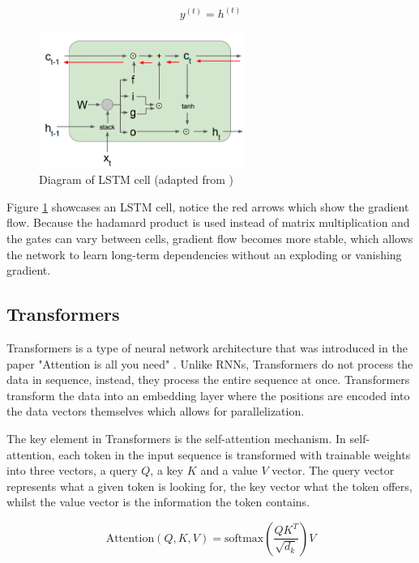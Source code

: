 \documentclass[11pt]{article}
\begin{document}
\begin{equation} y^{(t)} = h^{(t)} \end{equation}

\begin{figure}[h]
\centering
\includegraphics[width=0.6\textwidth]{lstm_diagram.png}
\caption{Diagram of LSTM cell (adapted from \cite{StanfordEngineering2020})}
\label{fig:lstm_diagram}
\end{figure}

Figure \ref{fig:lstm_diagram} showcases an LSTM cell, notice the red arrows which show the gradient flow. Because the hadamard product is used instead of matrix multiplication and the gates can vary between cells, gradient flow becomes more stable, which allows the network to learn long-term dependencies without an exploding or vanishing gradient.
\subsection{Transformers}

Transformers is a type of neural network architecture that was introduced in the paper "Attention is all you need" \cite{DBLP:journals/corr/VaswaniSPUJGKP17}. Unlike RNNs, Transformers do not process the data in sequence, instead, they process the entire sequence at once. Transformers transform the data into an embedding layer where the positions are encoded into the data vectors themselves which allows for parallelization.

The key element in Transformers is the self-attention mechanism. In self-attention, each token in the input sequence is transformed with trainable weights into three vectors, a query $Q$, a key $K$ and a value $V$ vector. The query vector represents what a given token is looking for, the key vector what the token offers, whilst the value vector is the information the token contains.

$$\text{Attention}(Q, K , V) = \text{softmax}\left(\frac{QK^T}{\sqrt{d_k}}\right)V$$
\end{document}
